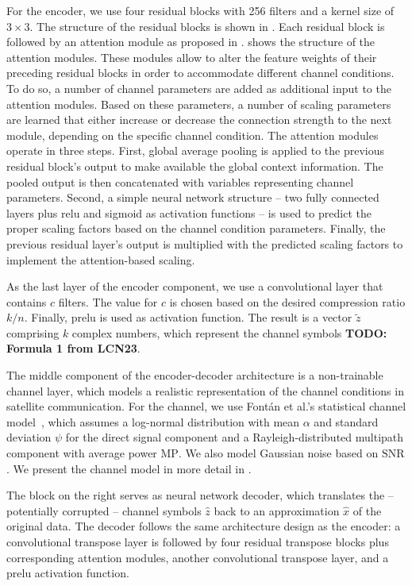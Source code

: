 \documentclass[conference]{IEEEtran}
\newcommand\MP{\ensuremath{\mathrm{MP}}\xspace}
\newcommand\SNR{\ensuremath{\mathrm{SNR}}\xspace}
\begin{document}
For the encoder, we use four residual blocks with 256 filters and a kernel size of $3 \times 3$.
The structure of the residual blocks is shown in .
Each residual block is followed by an attention module as proposed in \cite{wireless-attention-modules}.
 shows the structure of the attention modules.
These modules allow to alter the feature weights of their preceding residual blocks in order to accommodate different channel conditions.
To do so, a number of channel parameters are added as additional input to the attention modules.
Based on these parameters, a number of scaling parameters are learned that either increase or decrease the connection strength to the next module, depending on the specific channel condition.
The attention modules operate in three steps.
First, global average pooling is applied to the previous residual block's output to make available the global context information.
The pooled output is then concatenated with variables representing channel parameters.
Second, a simple neural network structure -- two fully connected layers plus \ac{relu} and sigmoid as activation functions -- is used to predict the proper scaling factors based on the channel condition parameters.
Finally, the previous residual layer's output is multiplied with the predicted scaling factors to implement the attention-based scaling.

As the last layer of the encoder component, we use a convolutional layer that contains $c$ filters.
The value for $c$ is chosen based on the desired compression ratio $k/n$.
Finally, \ac{prelu} is used as activation function.
The result is a vector $\tilde{z}$ comprising $k$ complex numbers, which represent the channel symbols \textbf{TODO: Formula 1 from LCN23}.

The middle component of the encoder-decoder architecture is a non-trainable channel layer, which models a realistic representation of the channel conditions in satellite communication.
For the channel, we use Fontán et al.'s statistical channel model~\cite{966585}, which assumes a log-normal distribution with mean $\alpha$ and standard deviation $\psi$ for the direct signal component and a Rayleigh-distributed multipath component with average power \MP. We also model Gaussian noise based on \SNR.
We present the channel model in more detail in .

The block on the right serves as neural network decoder, which translates the -- potentially corrupted -- channel symbols $\hat{z}$ back to an approximation $\hat{x}$ of the original data.
The decoder follows the same architecture design as the encoder: a convolutional transpose layer is followed by four residual transpose blocks plus corresponding attention modules,  another convolutional transpose layer, and a \ac{prelu} activation function.
\end{document}
